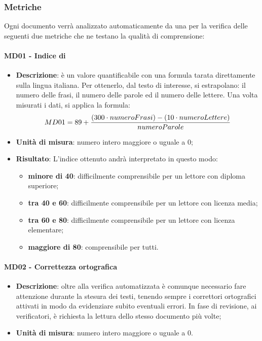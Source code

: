 	\subsubsection{Metriche}
	Ogni documento verrà analizzato automaticamente da una  per la verifica delle seguenti due metriche che ne testano la qualità di comprensione:

		\paragraph{MD01 - Indice di }
		\begin{itemize}
			\item \textbf{Descrizione}: è un valore quantificabile con una formula tarata direttamente sulla lingua italiana. Per ottenerlo, dal testo di interesse, si estrapolano: il numero delle frasi, il numero delle parole ed il numero delle lettere.
			Una volta misurati i dati, si applica la formula:
            \[
				MD01 = 89 + {{(300 \cdot numeroFrasi)} - {(10 \cdot numeroLettere)} \over {numeroParole}}
            \]
			\item \textbf{Unità di misura}: numero intero maggiore o uguale a 0;
			\item \textbf{Risultato}: L'indice ottenuto andrà interpretato in questo modo:
			\begin{itemize}
				\item \textbf{minore di 40}: difficilmente comprensibile per un lettore con diploma superiore;
				\item \textbf{tra 40 e 60}: difficilmente comprensibile per un lettore con licenza media;
				\item \textbf{tra 60 e 80}: difficilmente comprensibile per un lettore con licenza elementare;
				\item \textbf{maggiore di 80}: comprensibile per tutti.
			\end{itemize}
		\end{itemize}

		\paragraph{MD02 - Correttezza ortografica}
		\begin{itemize}
			\item \textbf{Descrizione}: oltre alla verifica automatizzata è comunque necessario fare attenzione durante la stesura dei testi, tenendo sempre i correttori ortografici attivati in modo da evidenziare subito eventuali errori. In fase di revisione, ai verificatori, è richiesta la lettura dello stesso documento più volte;
			\item \textbf{Unità di misura}: numero intero maggiore o uguale a 0.
		\end{itemize}
